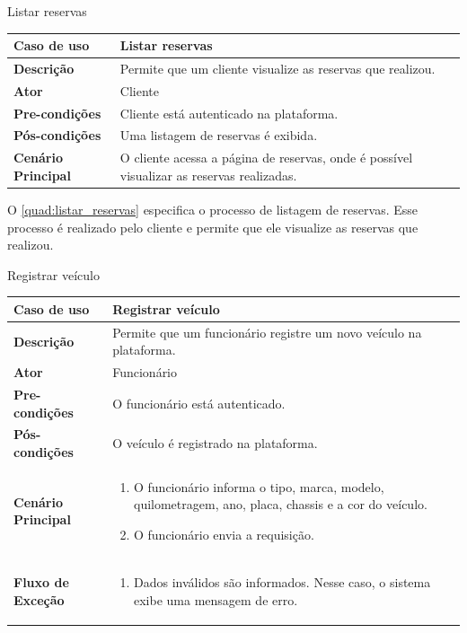 \begin{quadro}[H]
    \centering
    \caption{Listar reservas}
    \label{quad:listar_reservas}
    \begin{tabular}{|p{1.2in}|p{3.5in}|}
    \hline
    
    \textbf{Caso de uso} & Listar reservas \\ \hline
    \textbf{Descrição} & Permite que um cliente visualize as reservas que realizou. \\ \hline
    \textbf{Ator} & Cliente \\ \hline
    \textbf{Pre-condições} & Cliente está autenticado na plataforma. \\ \hline
    \textbf{Pós-condições} & Uma listagem de reservas é exibida. \\ \hline
    \textbf{Cenário Principal} & O cliente acessa a página de reservas, onde é possível visualizar as reservas realizadas. \\ \hline
    
    \end{tabular}
\end{quadro}

O \autoref{quad:listar_reservas} especifica o processo de listagem de reservas. Esse processo é realizado pelo cliente e permite que ele visualize as reservas que realizou.

\begin{quadro}[H]
    \centering
    \caption{Registrar veículo}
    \label{quad:registrar_veiculo}
    \begin{tabular}{|p{1.2in}|p{3.5in}|}
    \hline
    
    \textbf{Caso de uso} & Registrar veículo \\ \hline
    \textbf{Descrição} & Permite que um funcionário registre um novo veículo na plataforma. \\ \hline
    \textbf{Ator} & Funcionário \\ \hline
    \textbf{Pre-condições} & O funcionário está autenticado. \\ \hline
    \textbf{Pós-condições} & O veículo é registrado na plataforma. \\ \hline
    \textbf{Cenário Principal} & \begin{enumerate}
        \item O funcionário informa o tipo, marca, modelo, quilometragem, ano, placa, chassis e a cor do veículo.
        \item O funcionário envia a requisição.
    \end{enumerate}  \\ \hline
    \textbf{Fluxo de Exceção} & \begin{enumerate}
        \item Dados inválidos são informados. Nesse caso, o sistema exibe uma mensagem de erro.
    \end{enumerate}  \\ \hline
    \end{tabular}
\end{quadro}

